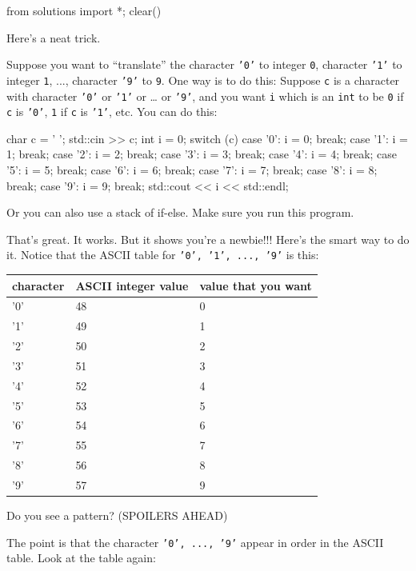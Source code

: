 \begin{python0}
from solutions import *; clear()
\end{python0}

Here's a neat trick.

Suppose you want to ``translate'' the character \texttt{'0'} to integer \texttt{0}, character \texttt{'1'} to integer \texttt{1}, ..., character \texttt{'9'} to \texttt{9}. One way is to do this: Suppose \texttt{c} is a character with character \texttt{'0'} or \texttt{'1'} or \ldots{} or \texttt{'9'}, and you want \texttt{i} which is an \texttt{int} to be \texttt{0} if \texttt{c} is \texttt{'0'}, \texttt{1} if \texttt{c} is \texttt{'1'}, etc. You can do this:

\begin{consolethree}[escapeinside=||]
char c = ' ';
std::cin >> c;
int i = 0;
switch (c)
{
    case '0': i = 0; break;
    case '1': i = 1; break;
    case '2': i = 2; break;
    case '3': i = 3; break;
    case '4': i = 4; break;
    case '5': i = 5; break;
    case '6': i = 6; break;
    case '7': i = 7; break;
    case '8': i = 8; break;
    case '9': i = 9; break;
}
std::cout << i << std::endl;
\end{consolethree}

Or you can also use a stack of if-else. Make sure you run this program.

That's great. It works. But it shows you're a newbie!!! Here's the smart way to do it. Notice that the ASCII table for \texttt{'0', '1', ..., '9'} is this:

\begin{tabular}{lll}
character & ASCII integer value & value that you want \\
\hline
'0' & 48 & 0 \\
'1' & 49 & 1 \\
'2' & 50 & 2 \\
'3' & 51 & 3 \\
'4' & 52 & 4 \\
'5' & 53 & 5 \\
'6' & 54 & 6 \\
'7' & 55 & 7 \\
'8' & 56 & 8 \\
'9' & 57 & 9 \\
\end{tabular}

Do you see a pattern? (SPOILERS AHEAD)

The point is that the character \texttt{'0', ..., '9'} appear in order in the ASCII table. Look at the table again:

